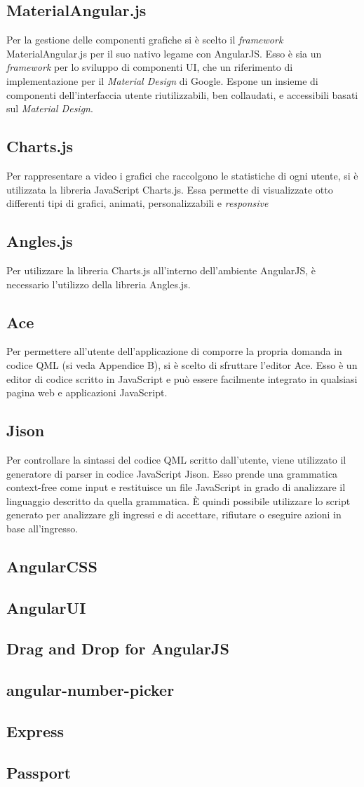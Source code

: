\subsection{MaterialAngular.js}
Per la gestione delle componenti grafiche si è scelto il \textit{framework} MaterialAngular.js per il suo nativo legame con AngularJS. Esso è sia un \textit{framework} per lo sviluppo di componenti UI, che un riferimento di implementazione per il \textit{Material Design} di Google. Espone un insieme di componenti dell'interfaccia utente riutilizzabili, ben collaudati, e accessibili basati sul \textit{Material Design}.
\subsection{Charts.js}
Per rappresentare a video i grafici che raccolgono le statistiche di ogni utente, si è utilizzata la libreria JavaScript Charts.js. Essa permette di visualizzate otto differenti tipi di grafici, animati, personalizzabili e \textit{responsive} 
\subsection{Angles.js}
Per utilizzare la libreria Charts.js all'interno dell'ambiente AngularJS, è necessario l'utilizzo della libreria Angles.js.
\subsection{Ace}
Per permettere all'utente dell'applicazione \progetto di comporre la propria domanda in codice QML (si veda Appendice B), si è scelto di sfruttare l'editor Ace. Esso è un editor di codice scritto in JavaScript e può essere facilmente integrato in qualsiasi pagina web e applicazioni JavaScript.
\subsection{Jison}
Per controllare la sintassi del codice QML scritto dall'utente, viene utilizzato il generatore di parser in codice JavaScript Jison. Esso prende una grammatica context-free come input e restituisce un file JavaScript in grado di analizzare il linguaggio descritto da quella grammatica. È quindi possibile utilizzare lo script generato per analizzare gli ingressi e di accettare, rifiutare o eseguire azioni in base all'ingresso.
\subsection{AngularCSS}
\subsection{AngularUI}
\subsection{Drag and Drop for AngularJS}
\subsection{angular-number-picker}
\subsection{Express}
\subsection{Passport}